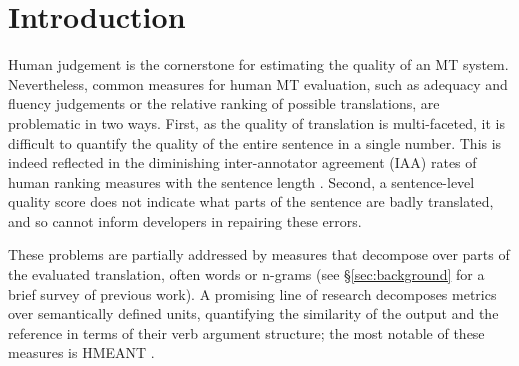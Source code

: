 \documentclass[11pt,letterpaper]{article}
\newcommand{\secref}[1]{\S\ref{#1}}
\def\parcite#1{\cite{#1}}
\begin{document}
\begin{abstract}

\end{abstract}


\section{Introduction}\label{sec:intro}


Human judgement is the cornerstone for estimating the quality of an MT system.
Nevertheless, common measures for human MT evaluation, such as adequacy and fluency judgements
or the relative ranking of possible translations, are problematic in two ways.
First, as the quality of translation is multi-faceted, it is difficult
to quantify the quality of the entire sentence in a single number. This
is indeed reflected in the diminishing inter-annotator agreement (IAA) rates of human ranking measures
with the sentence length \cite{Bojar:2011}.
Second, a sentence-level quality score does not indicate what parts of the sentence
are badly translated, and so cannot inform developers in repairing these errors.

These problems are partially addressed by measures that decompose over parts of the evaluated
translation, often words or n-grams (see \secref{sec:background} for a brief survey of previous
work). A promising line of research decomposes metrics
over semantically defined units, quantifying the similarity of the output and the
reference in terms of their verb argument structure; the most notable of these measures is HMEANT
\parcite{lo2011structured}.
\end{document}
